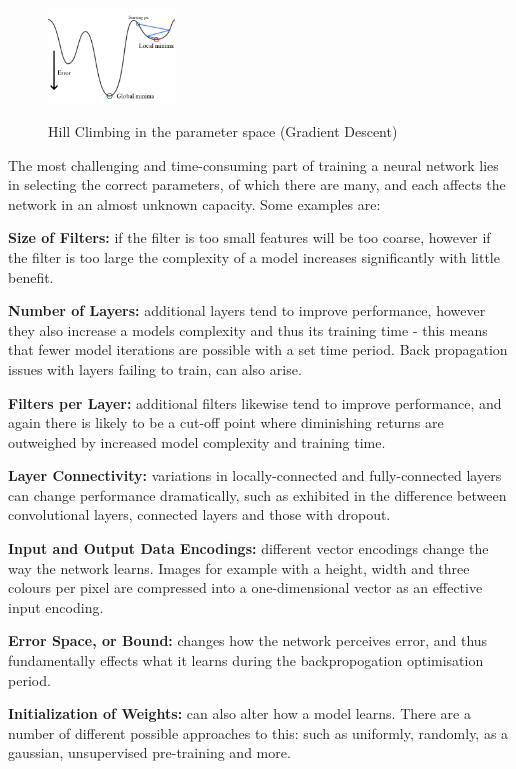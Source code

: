 \documentclass[a4paper,11pt,titlepage]{article}
\begin{document}
		\begin{figure}[H]
    			\centering	
			{{\includegraphics[width=0.3\textwidth]
    				{img/gradient_descent.png} 
    			}}%
    			\caption{Hill Climbing in the parameter space (Gradient Descent)}%
    			\label{fig:GradDesc}
		\end{figure}	
		
		\par 
		The most challenging and time-consuming part of training a neural network lies in selecting the correct parameters, of which there are many, and each affects the network in an almost unknown capacity. Some examples are:
		\par
		\textbf{Size of Filters:} if the filter is too small features will be too coarse, however if the filter is too large the complexity of a model increases significantly with little benefit.
		\par
		\textbf{Number of Layers:} additional layers tend to improve performance, however they also increase a models complexity and thus its training time - this means that fewer model iterations are possible with a set time period. Back propagation issues with layers failing to train, can also arise.
		\par 
		\textbf{Filters per Layer:} additional filters likewise tend to improve performance, and again there is likely to be a cut-off point where diminishing returns are outweighed by increased model complexity and training time.
		\par  
		\textbf{Layer Connectivity:} variations in locally-connected and fully-connected layers can change performance dramatically, such as exhibited in the difference between convolutional layers, connected layers and those with dropout.
		\par 
		\textbf{Input and Output Data Encodings:} different vector encodings change the way the network learns. Images for example with a height, width and three colours per pixel are compressed into a one-dimensional vector as an effective input encoding.
		\par  		
		\textbf{Error Space, or Bound:} changes how the network perceives error, and thus fundamentally effects what it learns during the backpropogation optimisation period.
		\par		 		
		\textbf{Initialization of Weights:} can also alter how a model learns. There are a number of different possible approaches to this: such as uniformly, randomly, as a gaussian, unsupervised pre-training and more.
		
\end{document}
